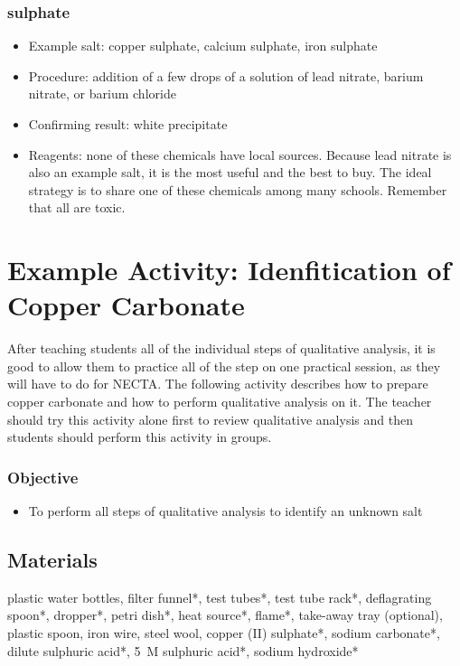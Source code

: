 \subsubsection{sulphate}
\begin{itemize}
\item{Example salt: copper sulphate, 
calcium sulphate, 
iron sulphate}
\item{Procedure: addition of a few drops of a solution of lead nitrate, 
barium nitrate, 
or barium chloride}
\item{Confirming result: white precipitate}
\item{Reagents: none of these chemicals have local sources. 
Because lead nitrate is also an example salt, 
it is the most useful and the best to buy. 
The ideal strategy is to share one of these chemicals among many schools. 
Remember that all are toxic.}
\end{itemize}

\section{Example Activity: Idenfitication of Copper Carbonate}

After teaching students all of the individual steps of qualitative analysis, it is good to allow them to practice all of the step on one practical session, as they will have to do for NECTA. The following activity describes how to prepare copper carbonate and how to perform qualitative analysis on it. The teacher should try this activity alone first to review qualitative analysis and then students should perform this activity in groups.

\subsubsection{Objective}
\begin{itemize}
\item{To perform all steps of qualitative analysis to identify an unknown salt}
\end{itemize}

\subsection{Materials}
plastic water bottles, filter funnel*, test tubes*, test tube rack*, deflagrating spoon*, dropper*, petri dish*, heat source*, flame*, take-away tray (optional), plastic spoon, iron wire, steel wool, copper (II) sulphate*, sodium carbonate*, dilute sulphuric acid*, 5~M sulphuric acid*, sodium hydroxide*

